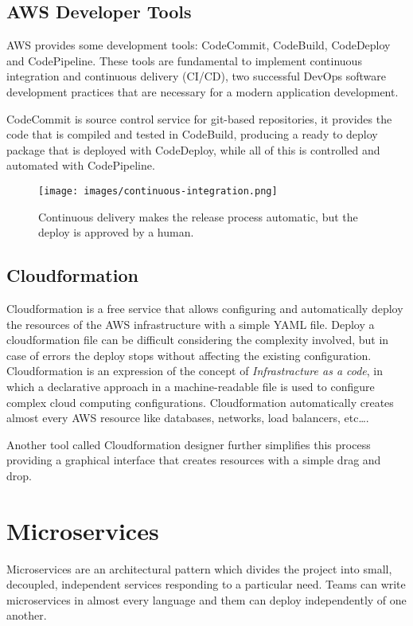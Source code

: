 \subsection{AWS Developer Tools}
AWS provides some development tools: CodeCommit, CodeBuild, CodeDeploy
and CodePipeline. These tools are fundamental to implement continuous
integration and continuous delivery (CI/CD), two successful DevOps
software development practices that are necessary for a modern
application development.
  
CodeCommit is source control service for git-based repositories, it
provides the code that is compiled and tested in CodeBuild, producing
a ready to deploy package that is deployed with CodeDeploy, while all
of this is controlled and automated with CodePipeline.
\begin{figure}[]
  \centering
  \texttt{[image: images/continuous-integration.png]}
  \caption{Continuous delivery makes the release process automatic,
    but the deploy is approved by a human.}
  \label{fig:cont_int}
\end{figure}


\subsection{Cloudformation}
\label{sec:cloudformation}
Cloudformation is a free service that allows configuring and automatically 
deploy the resources of the AWS infrastructure
with a simple YAML file\cite{cloudformation}. Deploy a cloudformation file can be difficult considering
the complexity involved, but in case of errors the deploy stops without affecting the existing
configuration.
Cloudformation is an expression of the concept of \textit{Infrastracture as a code}, 
in which a declarative approach in a machine-readable file is used to configure complex
cloud computing configurations. Cloudformation automatically
creates almost every AWS resource like databases, networks, load balancers, etc\dots.

Another tool called Cloudformation designer further simplifies this process providing
a graphical interface that creates resources with a simple drag and drop.



\section{Microservices}
\label{sub:microservices}
Microservices are an architectural pattern which divides the project
into small, decoupled, independent services responding to a particular
need.  Teams can write microservices in almost every language and them
can deploy independently of one another.

